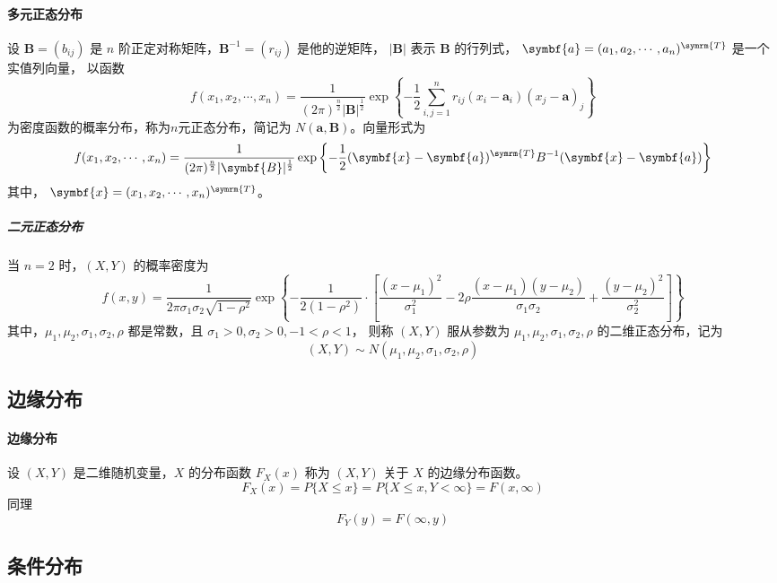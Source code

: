 \paragraph{多元正态分布} 设 $ \symbf{B} = (b_{ij}) $ 是 $ n $ 阶正定对称矩阵，$ \symbf{B}^{-1} = (r_{ij}) $ 是他的逆矩阵，
$ |\symbf{B}| $ 表示 $ \symbf{B} $ 的行列式， $ \symbf{a} = (a_{1} , a_{2} , \cdots , a_{n})^{\symrm{T}} $ 是一个实值列向量，
以函数
\begin{equation}
    f(x_{1}, x_{2}, \cdots, x_{n} ) = \frac{1}{(2\pi)^{\frac{n}{2}} |\symbf{B}|^{\frac{1}{2}}}
    \exp \left\{ -\frac{1}{2} \sum_{i,j=1}^n r_{ij} (x_i - \symbf{a}_i)(x_j - \symbf{a})_j \right\}
\end{equation}
为密度函数的概率分布，称为$ n $元正态分布，简记为 $ N(\symbf{a},\symbf{B}) $。向量形式为
\begin{equation}
    f(x_{1}, x_{2}, \cdots, x_{n} ) = \frac{1}{(2\pi)^{\frac{n}{2}} |\symbf{B}|^{\frac{1}{2}}}
    \exp \left\{ -\frac{1}{2} (\symbf{x} - \symbf{a})^{\symrm{T}} B^{-1} (\symbf{x} - \symbf{a}) \right\}
\end{equation}
其中， $ \symbf{x} = (x_{1}, x_{2}, \cdots, x_{n})^{\symrm{T}} $。

\subparagraph{二元正态分布} 当 $ n=2 $ 时，$ (X,Y) $ 的概率密度为
\begin{equation}
    f(x,y) = \frac{1}{2\pi \sigma_1 \sigma_2 \sqrt{1-\rho^2}}
    \exp \left\{ -\frac{1}{2(1-\rho^2)} \cdot
    \left[ \frac{(x-\mu_1)^2}{\sigma_1^2} -2\rho \frac{(x-\mu_1)(y-\mu_2)}{\sigma_1\sigma_2} + \frac{(y-\mu_2)^2}{\sigma_2^2} \right]
    \right\}
\end{equation}
其中，$ \mu_1, \mu_2, \sigma_1, \sigma_2, \rho $ 都是常数，且 $ \sigma_1 > 0, \sigma_2 > 0, -1 < \rho < 1 $，
则称 $ (X,Y) $ 服从参数为 $ \mu_1, \mu_2, \sigma_1, \sigma_2, \rho $ 的二维正态分布，记为
$$ (X,Y) \sim N(\mu_1, \mu_2, \sigma_1, \sigma_2, \rho) $$

\subsection{边缘分布}

\paragraph{边缘分布} 设 $ (X,Y) $ 是二维随机变量，$ X $ 的分布函数 $ F_X(x) $ 称为 $ (X,Y) $ 关于 $ X $ 的边缘分布函数。
$$ F_X(x) = P\{ X \leqslant x \} = P\{ X \leqslant x, Y < \infty \} = F(x,\infty) $$
同理 $$ F_Y(y) = F(\infty,y) $$

\subsection{条件分布}